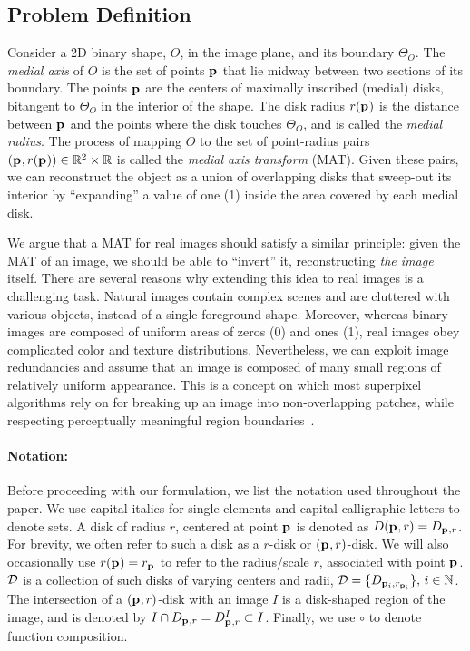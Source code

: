 \documentclass[10pt,twocolumn,letterpaper]{article}
\begin{document}
\subsection{Problem Definition}\label{sec:method:definition}
Consider a 2D binary shape, $O$, in the image plane, and its boundary $\Theta_O$.
The \emph{medial axis} of $O$ is the set of points $\mathbf{p}_{}$ that lie midway between two sections of 
its boundary. The points $\mathbf{p}_{}$ are the centers of maximally inscribed (medial) disks, bitangent to $\Theta_O$
in the interior of the shape. The disk radius $r(\mathbf{p}_{})$ is the distance between $\mathbf{p}_{}$ and 
the points where the disk touches $\Theta_O$, and is called the \emph{medial radius}.
The process of mapping $O$ to the set of point-radius pairs $(\mathbf{p}_{},r(\mathbf{p}_{})) \in \mathbb{R}^2 \times \mathbb{R}$
is called the \emph{medial axis transform} (MAT).
Given these pairs, we can reconstruct the object as a union of overlapping disks that sweep-out 
its interior by ``expanding'' a value of one (1) inside the area covered by each  medial disk.

We argue that a MAT for real images should satisfy a similar principle: given the MAT of an image, 
we should be able to ``invert'' it, reconstructing \emph{the image} itself.
There are several reasons why extending this idea to real images is a challenging task. 
Natural images contain complex scenes and are cluttered with various objects, instead of a single foreground shape.
Moreover, whereas binary images are composed of uniform areas of zeros (0) and ones (1), 
real images obey complicated color and texture distributions.
Nevertheless, we can exploit image redundancies and assume that an image is composed of many small regions of 
relatively uniform appearance.
This is a concept on which most superpixel algorithms rely on for breaking up an image 
into non-overlapping patches, while respecting perceptually meaningful region 
boundaries~\cite{shi2000normalized,levinshtein2009turbopixels,achanta2012slic}. 
\paragraph{Notation:} Before proceeding with our formulation, we list the notation used throughout the paper.
We use capital italics for single elements and capital calligraphic letters to denote sets. A disk of radius $r$,
centered at point $\mathbf{p}_{}$ is denoted as $D(\mathbf{p}_{},r)=D_{\mathbf{p}_{},r}$. 
For brevity, we often refer to such a disk as a $r$-disk or $(\mathbf{p}_{},r)$-disk.
We will also occasionally use $r(\mathbf{p}_{}) = r_{\mathbf{p}_{}}$ to refer to the radius/scale $r$, associated with point $\mathbf{p}_{}$.
$\mathcal{D}$ is a collection of such disks of varying centers and radii, $\mathcal{D}=\{ D_{\mathbf{p}_{i},r_{\mathbf{p}_{i}}} \},\, i\in\mathbb{N}$.
The intersection of a $(\mathbf{p}_{},r)$-disk with an image $I$ is a disk-shaped region of the image, and is denoted by 
$I \cap D_{\mathbf{p}_{},r}=D_{\mathbf{p}_{},r}^I \subset I$. Finally, we use $\circ$ to denote function composition.
\end{document}

